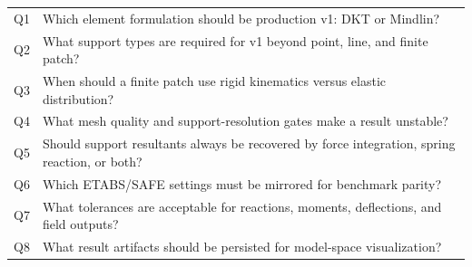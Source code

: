 \documentclass[10pt]{article}
\begin{document}
{\ttfamily\footnotesize
\begin{tabular}{@{}p{0.8in}p{5.9in}@{}}
Q1 & Which element formulation should be production v1: DKT or Mindlin? \\
Q2 & What support types are required for v1 beyond point, line, and finite patch? \\
Q3 & When should a finite patch use rigid kinematics versus elastic distribution? \\
Q4 & What mesh quality and support-resolution gates make a result unstable? \\
Q5 & Should support resultants always be recovered by force integration, spring reaction, or both? \\
Q6 & Which ETABS/SAFE settings must be mirrored for benchmark parity? \\
Q7 & What tolerances are acceptable for reactions, moments, deflections, and field outputs? \\
Q8 & What result artifacts should be persisted for model-space visualization? \\
\end{tabular}
}
\end{document}
